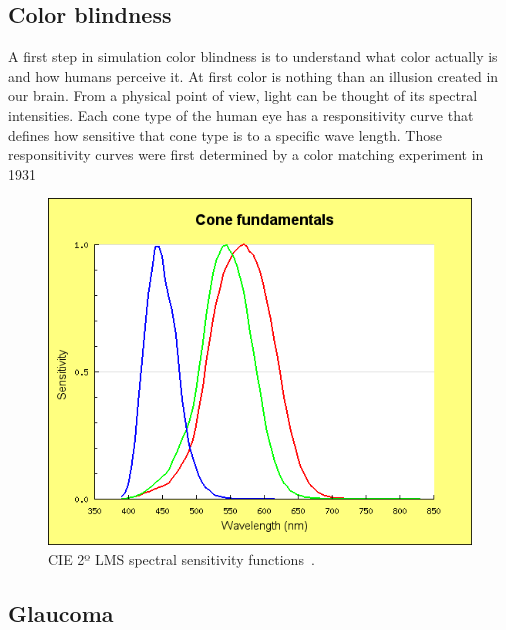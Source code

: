 \documentclass{acm_proc_article-sp}
\begin{document}
\subsection{Color blindness}
A first step in simulation color blindness is to understand what color actually is and how humans perceive it.
At first color is nothing than an illusion created in our brain.
From a physical point of view, light can be thought of its spectral intensities.
Each cone type of the human eye has a responsitivity curve that defines how sensitive that cone type is to a specific wave length.
Those responsitivity curves were first determined by a color matching experiment in 1931

\begin{figure}
    \includegraphics[width=\columnwidth]{lms-sensitivity.png}
    \caption{CIE 2º LMS spectral sensitivity functions~\cite{cvrl-lms-web}.}
    \label{fig:lmscurves}
\end{figure}
%
%
\subsection{Glaucoma}
\end{document}
